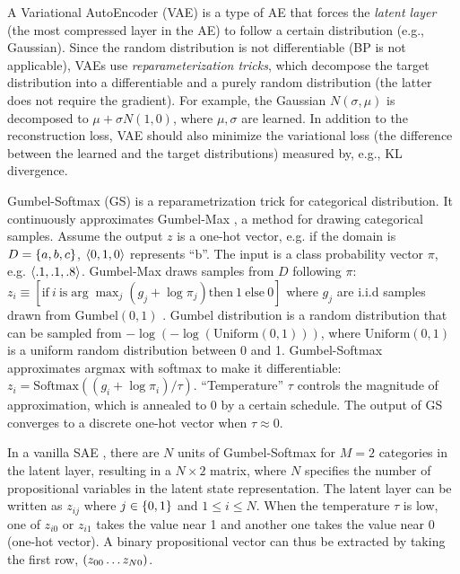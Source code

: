 A Variational AutoEncoder (VAE) \cite{kingma2013auto} is a type of AE that forces the \emph{latent layer} (the most compressed layer in the AE) to follow a certain distribution (e.g., Gaussian).
Since the random distribution is not differentiable (BP is not applicable), VAEs use \emph{reparameterization tricks}, which decompose the target distribution into a differentiable and a purely random distribution (the latter does not require the gradient).
For example, the Gaussian $N(\sigma,\mu)$ is decomposed to $\mu+\sigma N(1,0)$, where $\mu,\sigma$ are learned.
In addition to the reconstruction loss, VAE should also minimize the variational loss (the difference between the learned and the target distributions) measured by, e.g.,  KL divergence.

Gumbel-Softmax (GS) is a re\-para\-metri\-zation trick \cite{jang2016categorical} for categorical distribution.
It continuously approximates Gumbel-Max \cite{maddison2014sampling}, a method for drawing categorical samples.
Assume the output $z$ is a one-hot vector, e.g. if the domain is $D={\left\{a,b,c\right\}}$, ${\left<0,1,0\right>}$ represents ``b''.
The input is a class probability vector $\pi$, e.g. ${\left<.1,.1,.8\right>}$.
Gumbel-Max draws samples from $D$ following $\pi$:
 $z_i \equiv [ \text{if}\ i\ \text{is} \arg \max_j (g_j+\log \pi_j) \text{then}\ 1\ \text{else}\ 0 ]$
where $g_j$ are i.i.d samples drawn from Gumbel$(0,1)$ \cite{gumbel1954statistical}.
Gumbel distribution is a random distribution that can be sampled from $-\log (-\log (\text{Uniform}(0,1)))$, where
$\text{Uniform}(0,1)$ is a uniform random distribution between 0 and 1.
Gumbel-Softmax approximates argmax with softmax to make it differentiable:
$z_i = \text{Softmax}((g_i+\log \pi_i)/\tau)$.
``Temperature'' $\tau$ controls the magnitude of approximation, which is annealed to 0 by a certain schedule.
The output of GS converges to a discrete one-hot vector when $\tau\approx 0$.

In a vanilla SAE \cite{Asai2018}, there are $N$ units of Gumbel-Softmax
for $M=2$ categories in the latent layer, resulting in a $N\times 2$ matrix,
where $N$ specifies the number of propositional variables in the latent
state representation. The latent layer can be written as
$z_{ij}$ where $j\in {\left\{0,1\right\}}$ and $1\leq i \leq N$.  When the
temperature $\tau$ is low, one of $z_{i0}$ or $z_{i1}$ takes the value
near 1 and another one takes the value near 0 (one-hot vector).  A binary
propositional vector can thus be extracted by taking the first row,
${\left(z_{00}\ldots z_{N0}\right)}$.

